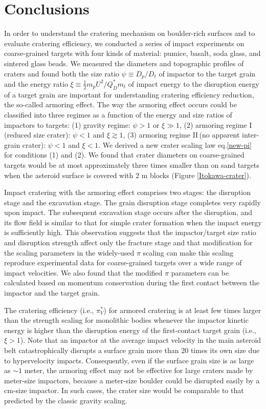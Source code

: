 \documentclass[3p,authoryear]{elsarticle}
\newcommand{\II}{I\hspace{-.1 em}I}
\begin{document}
 \section{Conclusions}\label{sec:conclusion}
In order to understand the cratering mechanism on boulder-rich surfaces and to evaluate cratering efficiency, we conducted a series of impact experiments on coarse-grained targets with four kinds of material: pumice, basalt, soda glass, and sintered glass beads. We measured the diameters and topographic profiles of craters and found both the size ratio $\psi\equiv D_p/D_t$ of impactor to the target grain and the energy ratio $\xi\equiv \frac{1}{2}m_pU^2/Q_D^*m_t$ of impact energy to the disruption energy of a target grain are important for understanding cratering efficiency reduction, the so-called armoring effect. The way the armoring effect occurs could be classified into three regimes as a function of the energy and size ratios of impactors to targets: (1) gravity regime: $\psi>1$ or $\xi\gg 1$, (2) armoring regime I (reduced size crater): $\psi<1$ and $\xi\gtrsim 1$, (3) armoring regime \II\,(no apparent inter-grain crater): $\psi<1$ and $\xi<1$. We derived a new crater scaling law eq.\eqref{new-pi} for conditions (1) and (2). We found that crater diameters on coarse-grained targets would be at most approximately three times smaller than on sand targets when the asteroid surface is covered with 2 m blocks (Figure \ref{Itokawa-crater}).

Impact cratering with the armoring effect comprises two stages: the disruption stage and the excavation stage. The grain disruption stage completes very rapidly upon impact. The subsequent excavation stage occurs after the disruption, and its flow field is similar to that for simple crater formation when the impact energy is sufficiently high. This observation suggests that the impactor/target size ratio and disruption strength affect only the fracture stage and that modification for the scaling parameters in the widely-used $\pi$ scaling \citep[e.g.,][]{holsapple1993} can make this scaling reproduce experimental data for coarse-grained targets over a wide range of impact velocities. We also found that the modified $\pi$ parameters can be calculated based on momentum conservation during the first contact between the impactor and the target grain.

The cratering efficiency (i.e., $\pi_V^*$) for armored cratering is at least few times larger than the strength scaling for monolithic bodies whenever the impactor kinetic energy is higher than the disruption energy of the first-contact target grain (i.e., $\xi>1$). Note that an impactor at the average impact velocity in the main asteroid belt catastrophically disrupts a surface grain more than 20 times its own size due to hypervelocity impacts. Consequently, even if the surface grain size is as large as $\sim 1$  meter, the armoring effect may not be effective for large craters made by meter-size impactors, because a meter-size boulder could be disrupted easily by a cm-size impactor. In such cases, the crater size would be comparable to that predicted by the classic gravity scaling.
\end{document}
